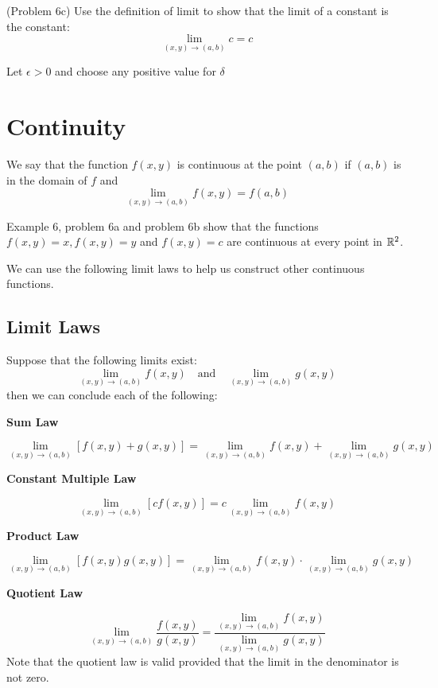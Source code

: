 \documentclass[handout]{ximera}
\begin{document}
\begin{problem}(Problem 6c)
Use the definition of limit to show that the limit of a constant is the constant:
\[
\lim_{(x,y) \to (a,b)} c = c
\]
\begin{hint}
Let $\epsilon >0$ and choose any positive value for $\delta$
\end{hint}
\end{problem}


\section{Continuity}

\begin{definition}[Continuity]
We say that the function $f(x,y)$ is continuous at the point $(a,b)$ if $(a,b)$ is in the domain of $f$ and 
\[
\lim_{(x,y) \to (a,b)} f(x,y) = f(a,b)
\]
\end{definition}

Example 6, problem 6a and problem 6b show that the functions $f(x,y) = x, f(x,y) = y$ and $f(x,y) = c$ are continuous at every point in $\mathbb R^2$.

We can use the following limit laws to help us construct other continuous functions.

\subsection{Limit Laws}
Suppose that the following limits exist:
\[
\lim_{(x,y) \to (a,b)} f(x,y) \quad \text{and} \quad \lim_{(x,y) \to (a,b)} g(x,y)
\]
then we can conclude each of the following:
\begin{center} 
\textbf{Sum Law} 
\end{center}
\[
\lim_{(x,y) \to (a,b)} [f(x,y) + g(x,y)] = \lim_{(x,y) \to (a,b)} f(x,y) +\lim_{(x,y) \to (a,b)}  g(x,y) 
\]
\begin{center} 
\textbf{Constant Multiple Law} 
\end{center}
\[
\lim_{(x,y) \to (a,b)} [cf(x,y) ] = c\lim_{(x,y) \to (a,b)} f(x,y) 
\]
\begin{center} 
\textbf{Product Law}
\end{center}
\[
\lim_{(x,y) \to (a,b)} [f(x,y)  g(x,y)] = \lim_{(x,y) \to (a,b)} f(x,y) \cdot \lim_{(x,y) \to (a,b)}  g(x,y)  
\]
\begin{center} 
\textbf{Quotient Law} 
\end{center}
\[
\lim_{(x,y) \to (a,b)} \frac{f(x,y)}{g(x,y)} = \frac{\lim_{(x,y) \to (a,b)} f(x,y)}{\lim_{(x,y) \to (a,b)}  g(x,y)}  
\]
Note that the quotient law is valid provided that the limit in the denominator is not zero.
\end{document}
